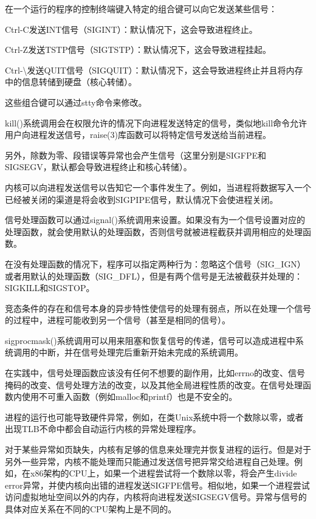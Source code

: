 在一个运行的程序的控制终端键入特定的组合键可以向它发送某些信号：

\begin{compactitem}
\item Ctrl-C发送INT信号（SIGINT）：默认情况下，这会导致进程终止。
\item Ctrl-Z发送TSTP信号（SIGTSTP）：默认情况下，这会导致进程挂起。
\item Ctrl-\textbackslash 发送QUIT信号（SIGQUIT）：默认情况下，这会导致进程终止并且将内存中的信息转储到硬盘（核心转储）。
\item 这些组合键可以通过stty命令来修改。
\end{compactitem}

kill()系统调用会在权限允许的情况下向进程发送特定的信号，类似地kill命令允许用户向进程发送信号，raise(3)库函数可以将特定信号发送给当前进程。

另外，除数为零、段错误等异常也会产生信号（这里分别是SIGFPE和SIGSEGV，默认都会导致进程终止和核心转储）。

内核可以向进程发送信号以告知它一个事件发生了。例如，当进程将数据写入一个已经被关闭的渠道是将会收到SIGPIPE信号，默认情况下会使进程关闭。

信号处理函数可以通过signal()系统调用来设置。如果没有为一个信号设置对应的处理函数，就会使用默认的处理函数，否则信号就被进程截获并调用相应的处理函数。

在没有处理函数的情况下，程序可以指定两种行为：忽略这个信号（SIG\_IGN）或者用默认的处理函数（SIG\_DFL），但是有两个信号是无法被截获并处理的：SIGKILL和SIGSTOP。

竞态条件的存在和信号本身的异步特性使信号的处理有弱点，所以在处理一个信号的过程中，进程可能收到另一个信号（甚至是相同的信号）。

sigprocmask()系统调用可以用来阻塞和恢复信号的传递，信号可以造成进程中系统调用的中断，并在信号处理完后重新开始未完成的系统调用。

在实践中，信号处理函数应该没有任何不想要的副作用，比如errno的改变、信号掩码的改变、信号处理方法的改变，以及其他全局进程性质的改变。在信号处理函数内使用不可重入函数（例如malloc和printf）也是不安全的。

进程的运行也可能导致硬件异常，例如，在类Unix系统中将一个数除以零，或者出现TLB不命中都会自动运行内核的异常处理程序。

对于某些异常如页缺失，内核有足够的信息来处理完并恢复进程的运行。但是对于另外一些异常，内核不能处理而只能通过发送信号把异常交给进程自己处理。例如，在x86架构的CPU上，如果一个进程尝试将一个数除以零，将会产生divide error异常，并使内核向出错的进程发送SIGFPE信号。相似地，如果一个进程尝试访问虚拟地址空间以外的内存，内核将向进程发送SIGSEGV信号。异常与信号的具体对应关系在不同的CPU架构上是不同的。



